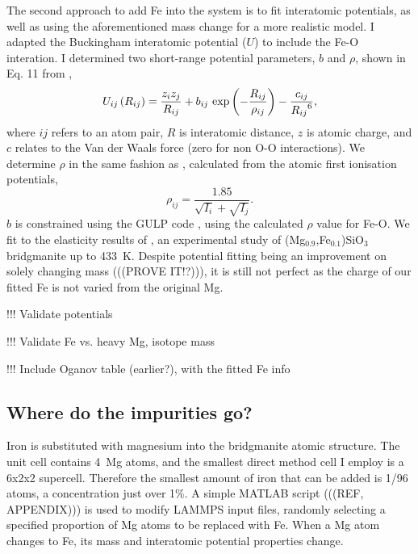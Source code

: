 The second approach to add Fe into the \mgsios system is to fit interatomic potentials, as well as using the aforementioned mass change for a more realistic model. I adapted the \citet{Oganov2000} \mgsios Buckingham interatomic potential ($U$) to include the Fe-O interation. I determined two short-range potential parameters, $b$ and $\rho$, shown in Eq. 11 from \citet{Oganov2000},
%
\begin{equation}
U_{ij}\left ( R_{ij} \right ) = \frac{z_{i}z_{j}}{R_{ij}} + b_{ij}\ \textup{exp}\left ( - \frac{R_{ij}}{\rho_{ij}} \right ) - \frac{c_{ij}}{{R_{ij}}^{6}}, \label{og_buck}
\end{equation}
%
where $ij$ refers to an atom pair, $R$ is interatomic distance, $z$ is atomic charge, and $c$ relates to the Van der Waals force (zero for non O-O interactions). We determine $\rho$ in the same fashion as \citet{Oganov2000}, calculated from the atomic first ionisation potentials,
%
\begin{equation}
\rho_{ij} = \frac{1.85}{\sqrt{I_{i}}+\sqrt{I_{j}}}.  \label{urusov}
\end{equation}
%
$b$ is constrained using the GULP code \citep{Gale1997}, using the calculated $\rho$ value for Fe-O. We fit to the elasticity results of \citet{Parise1990}, an experimental study of (Mg$_{0.9}$,Fe$_{0.1}$)SiO$_3$ bridgmanite up to 433~K. Despite potential fitting being an improvement on solely changing mass (((PROVE IT!?))), it is still not perfect as the charge of our fitted Fe is not varied from the original Mg.

!!! Validate potentials

!!! Validate Fe vs. heavy Mg, isotope mass

!!! Include Oganov table (earlier?), with the fitted Fe info


\subsection{Where do the impurities go?} 

Iron is substituted with magnesium into the bridgmanite atomic structure. The unit cell contains 4~Mg atoms, and the smallest direct method cell I employ is a 6x2x2 supercell. Therefore the smallest amount of iron that can be added is 1/96 atoms, a concentration just over 1\%. A simple MATLAB script (((REF, APPENDIX))) is used to modify LAMMPS input files, randomly selecting a specified proportion of Mg atoms to be replaced with Fe. When a Mg atom changes to Fe, its mass and interatomic potential properties change. 

